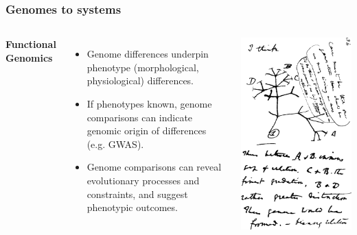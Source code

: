 %
\begin{frame}
  \frametitle{Genomes to systems}
    \begin{columns}[c] 
        \textcolor{RawSienna}{\textbf{Functional Genomics}}
        \begin{itemize}
         \item \textcolor{hutton_green}{Genome differences underpin phenotype (morphological, physiological) differences.}
         \item \textcolor{hutton_purple}{If phenotypes known, genome comparisons can indicate genomic origin of differences (e.g. GWAS).}
         \item \textcolor{hutton_blue}{Genome comparisons can reveal evolutionary processes and constraints, and suggest phenotypic outcomes.}
        \end{itemize}
        \includegraphics[width=\textwidth]{images/darwin_tree}
    \end{columns}  
\end{frame}



